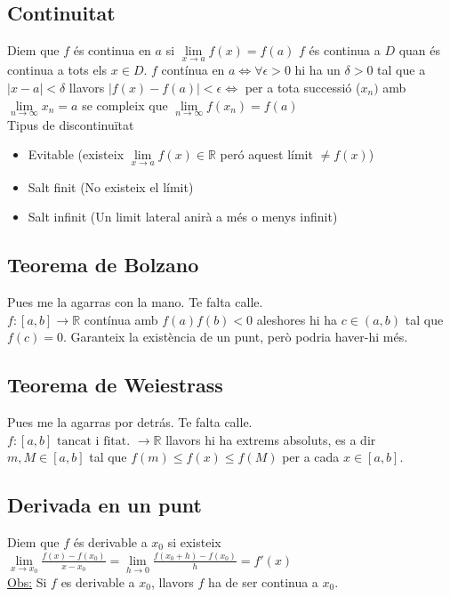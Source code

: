 \documentclass[../main.tex]{subfiles}
\begin{document}
    \subsection{Continuitat}
    Diem que $f$ és continua en $a$ si $\lim\limits_{x\rightarrow a} f(x) = f(a)$ $f$ és continua a $D$ quan és continua a tots els $x \in D$. $f$ contínua en $a \Longleftrightarrow \forall \epsilon > 0$ hi ha un $\delta > 0$ tal que a $|x-a| < \delta$ llavors $|f(x) - f(a)| < \epsilon \Longleftrightarrow$ per a tota successió ($x_n)$ amb $\lim\limits_{n\rightarrow \infty} x_n = a$ se compleix que $\lim\limits_{n\rightarrow \infty} f(x_n) = f(a)$\\
    Tipus de discontinuïtat
    \begin{itemize}
        \item Evitable (existeix $\lim\limits_{x\rightarrow a} f(x) \in \mathbb{R}$ peró aquest límit $\neq f(x)$)
        \item Salt finit (No existeix el límit) 
        \item Salt infinit (Un limit lateral anirà a més o menys infinit)
    \end{itemize}
    \subsection{Teorema de Bolzano}
    Pues me la agarras con la mano. Te falta calle.\\
    $f: [a, b] \rightarrow \mathbb{R}$ contínua amb $f(a)f(b)<0$ aleshores hi ha $c\in (a,b)$ tal que $f(c) = 0$. Garanteix la existència de un punt, però podria haver-hi més.
    \subsection{Teorema de Weiestrass}
    Pues me la agarras por detrás. Te falta calle.\\
    $f: [a, b] \text{ tancat i fitat. } \rightarrow \mathbb{R}$ llavors hi ha extrems absoluts, es a dir $m, M \in [a, b]$ tal que $f(m) \leq f(x) \leq f(M)$ per a cada $x \in [a, b]$.
    \subsection{Derivada en un punt}
    Diem que $f$ és derivable a $x_0$ si existeix $\lim\limits_{x\rightarrow x_0} \frac{f(x)-f(x_0)}{x-x_0} = \lim\limits_{h\rightarrow 0} \frac{f(x_0+h)-f(x_0)}{h} = f'(x)$\\
    \underline{Obs:} Si $f$ es derivable a $x_0$, llavors $f$ ha de ser continua a $x_0$.
\end{document}
